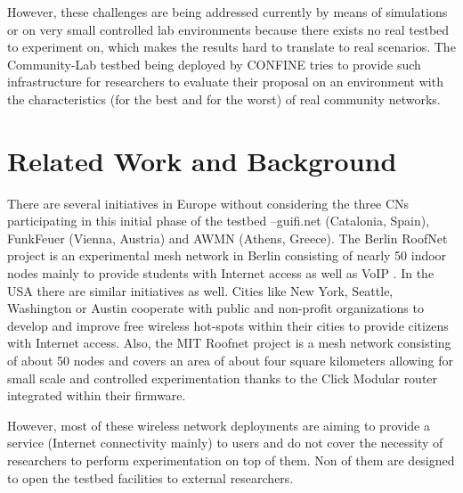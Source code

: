 \documentclass[conference]{IEEEtran}
\begin{document}

However, these challenges are being addressed currently by means of simulations 
or on very small controlled lab environments because there exists no real testbed
to experiment on, which makes the results hard to translate to real scenarios. The Community-Lab testbed
being deployed by CONFINE tries to provide such infrastructure for researchers to evaluate
their proposal on an environment with the characteristics (for the best and for the worst)
of real community networks.

\section{Related Work and Background}
\label{sec:related-work}

There are several initiatives in Europe without considering the three CNs participating in this initial
phase of the testbed --guifi.net (Catalonia, Spain), FunkFeuer (Vienna, Austria) and AWMN (Athens, Greece). The Berlin RoofNet project is an
experimental mesh network in Berlin consisting of nearly 50 indoor nodes mainly to provide
students with Internet access as well as VoIP \cite{berlin-roofnet}. In the USA there are similar initiatives as well. Cities like New York, Seattle, Washington or Austin cooperate with
public and non-profit organizations to develop and improve free wireless hot-spots within 
their cities to provide citizens with Internet access. Also, the MIT Roofnet \cite{mit-roofnet} project
is a mesh network consisting of about 50 nodes and covers an area of about four square
kilometers allowing for small scale and controlled experimentation thanks to the
Click Modular router integrated within their firmware. 

However, most of  these wireless network deployments 
are aiming to provide a service (Internet connectivity mainly) to users and do not
cover the necessity of researchers to perform experimentation on top of them.
Non of them are designed to open the testbed facilities to external researchers.

\end{document}
